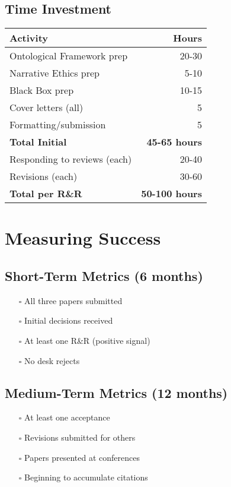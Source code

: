 \documentclass[12pt]{article}
\begin{document}
\subsection{Time Investment}

\begin{center}
\begin{tabular}{|l|r|}
\hline
\textbf{Activity} & \textbf{Hours} \\
\hline
Ontological Framework prep & 20-30 \\
Narrative Ethics prep & 5-10 \\
Black Box prep & 10-15 \\
Cover letters (all) & 5 \\
Formatting/submission & 5 \\
\hline
\textbf{Total Initial} & \textbf{45-65 hours} \\
\hline
\hline
Responding to reviews (each) & 20-40 \\
Revisions (each) & 30-60 \\
\hline
\textbf{Total per R\&R} & \textbf{50-100 hours} \\
\hline
\end{tabular}
\end{center}

\section{Measuring Success}

\subsection{Short-Term Metrics (6 months)}

\begin{itemize}[leftmargin=*]
\item[$\square$] All three papers submitted
\item[$\square$] Initial decisions received
\item[$\square$] At least one R\&R (positive signal)
\item[$\square$] No desk rejects
\end{itemize}

\subsection{Medium-Term Metrics (12 months)}

\begin{itemize}[leftmargin=*]
\item[$\square$] At least one acceptance
\item[$\square$] Revisions submitted for others
\item[$\square$] Papers presented at conferences
\item[$\square$] Beginning to accumulate citations
\end{itemize}
\end{document}
